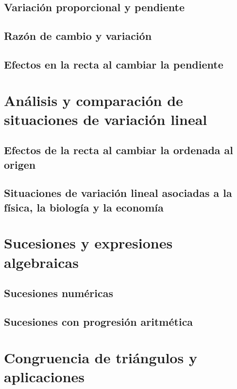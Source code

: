 \documentclass[11pt]{book}
\begin{document}
\subsection{Variación proporcional y pendiente}

\subsection{Razón de cambio y variación}

\subsection{Efectos en la recta al cambiar la pendiente}

\newpage \thispagestyle{plain}

\section{Análisis y comparación de situaciones de variación lineal}

\subsection{Efectos de la recta al cambiar la ordenada al origen}

\subsection{Situaciones de variación lineal asociadas a la física, la biología y la economía}

\newpage \thispagestyle{plain}

\section{Sucesiones y expresiones algebraicas}

\subsection{Sucesiones numéricas}

\subsection{Sucesiones con progresión aritmética}


\newpage \thispagestyle{plain}

\section{Congruencia de triángulos y aplicaciones}
\end{document}
